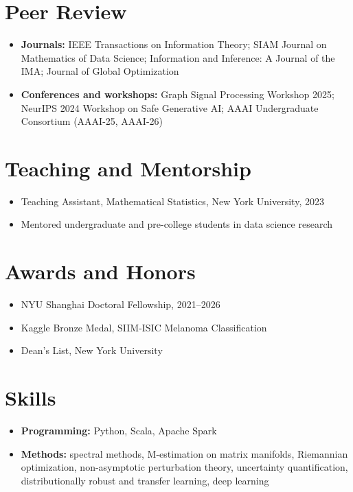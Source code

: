 \documentclass[letterpaper,11pt]{article}
\begin{document}
\section*{Peer Review}
\begin{itemize}
  \item \textbf{Journals:} IEEE Transactions on Information Theory; SIAM Journal on Mathematics of Data Science; Information and Inference: A Journal of the IMA; Journal of Global Optimization
  \item \textbf{Conferences and workshops:} Graph Signal Processing Workshop 2025; NeurIPS 2024 Workshop on Safe Generative AI; AAAI Undergraduate Consortium (AAAI-25, AAAI-26)
\end{itemize}

\section*{Teaching and Mentorship}
\begin{itemize}
  \item Teaching Assistant, Mathematical Statistics, New York University, 2023
  \item Mentored undergraduate and pre-college students in data science research
\end{itemize}

\section*{Awards and Honors}
\begin{itemize}
  \item NYU Shanghai Doctoral Fellowship, 2021--2026
  \item Kaggle Bronze Medal, SIIM-ISIC Melanoma Classification
  \item Dean's List, New York University
\end{itemize}

\section*{Skills}
\begin{itemize}
  \item \textbf{Programming:} Python, Scala, Apache Spark
  \item \textbf{Methods:} spectral methods, M-estimation on matrix manifolds, Riemannian optimization, non-asymptotic perturbation theory, uncertainty quantification, distributionally robust and transfer learning, deep learning
\end{itemize}
\end{document}
